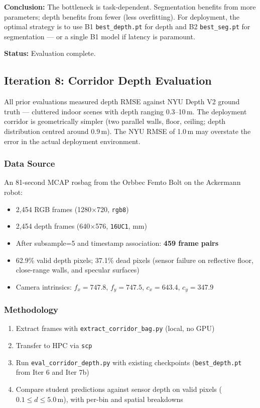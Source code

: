 \documentclass[11pt,a4paper]{article}
\begin{document}
\textbf{Conclusion:} The bottleneck is task-dependent. Segmentation
benefits from more parameters; depth benefits from fewer (less
overfitting). For deployment, the optimal strategy is to use
B1 \texttt{best\_depth.pt} for depth and B2 \texttt{best\_seg.pt}
for segmentation --- or a single B1 model if latency is paramount.

\textbf{Status:} Evaluation complete.

\subsection{Iteration 8: Corridor Depth Evaluation}

All prior evaluations measured depth RMSE against NYU Depth V2 ground truth
--- cluttered indoor scenes with depth ranging 0.3--10\,m. The deployment
corridor is geometrically simpler (two parallel walls, floor, ceiling;
depth distribution centred around 0.9\,m). The NYU RMSE of 1.0\,m may
overstate the error in the actual deployment environment.

\subsubsection{Data Source}

An 81-second MCAP rosbag from the Orbbec Femto Bolt on the Ackermann robot:
\begin{itemize}[nosep]
  \item 2,454 RGB frames (1280$\times$720, \texttt{rgb8})
  \item 2,454 depth frames (640$\times$576, \texttt{16UC1}, mm)
  \item After subsample=5 and timestamp association: \textbf{459 frame pairs}
  \item 62.9\% valid depth pixels; 37.1\% dead pixels (sensor failure on
    reflective floor, close-range walls, and specular surfaces)
  \item Camera intrinsics: $f_x=747.8$, $f_y=747.5$, $c_x=643.4$, $c_y=347.9$
\end{itemize}

\subsubsection{Methodology}

\begin{enumerate}[nosep]
  \item Extract frames with \texttt{extract\_corridor\_bag.py} (local, no GPU)
  \item Transfer to HPC via \texttt{scp}
  \item Run \texttt{eval\_corridor\_depth.py} with existing checkpoints
    (\texttt{best\_depth.pt} from Iter 6 and Iter 7b)
  \item Compare student predictions against sensor depth on valid pixels
    ($0.1 \leq d \leq 5.0$\,m), with per-bin and spatial breakdowns
\end{enumerate}
\end{document}
